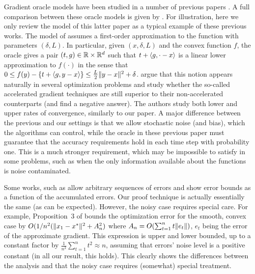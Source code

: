 Gradient oracle models have been studied in a number of previous papers 
\citep{dAsp08,Baes09,SchRoBa11,DeGliNe14}.
A full comparison between these oracle models is given by \cite{DeGliNe14}.
For illustration, here we only review the model of this latter paper as a typical example of these previous works.
The model of \cite{DeGliNe14} assumes a first-order approximation to the function
with parameters $(\delta,L)$. In particular, 
given $(x,\delta,L)$ and the convex function $f$, 
the oracle gives a pair $(t,g)\in \mathbb{R} \times \mathbb{R}^d$
such that $t + \langle g,\cdot-x \rangle$ is a linear lower approximation to $f(\cdot)$ in the sense that 
$0\le f(y) - \left\{ t+ \langle g,y-x \rangle\right\} \le \frac{L}{2} \|y-x\|^2 + \delta$.
\cite{DeGliNe14} argue that this notion appears naturally in several optimization problems and study whether the so-called accelerated gradient techniques are still superior to their non-accelerated counterparts (and find a negative answer).
The authors study both lower and upper rates of convergence, similarly to our paper.
A major difference between the previous and our settings is that we allow stochastic noise (and bias), which the algorithms can control, while the oracle in these previous paper must guarantee that the accuracy requirements hold in each time step
with probability one.
This is a much stronger requirement, which may be impossible to satisfy in some problems, such as when 
the only information available about the functions is noise contaminated.

Some works, such as \citet{SchRoBa11} allow arbitrary sequences of errors and show error bounds as a function
of the accumulated errors. 
Our proof technique is actually essentially the same (as can be expected).
However, the noisy case requires special care. For example, Proposition~3 of
\citet{SchRoBa11}  bounds the optimization error for the smooth, convex case by 
$O(1/n^2 ( \|x_1-x^*\|^2 + A_n^2 )$ where $A_n = O( \sum_{t=1}^n t \|e_t\|)$, $e_t$ being the error of the approximate gradient. This expression is upper and lower bounded, up to a constant factor by
 $\frac{1}{n^2} \sum_{t=1}^n t^2 \approx n$,
assuming that errors' noise level is a positive constant (in all our result, this holds).
This clearly shows the differences between the analysis and that the noisy case requires (somewhat) special treatment.

